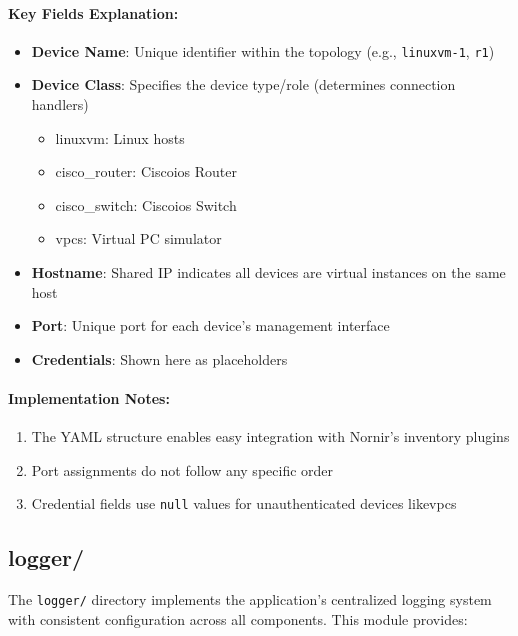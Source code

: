         \paragraph{Key Fields Explanation:}
        \begin{itemize}
            \item \textbf{Device Name}: Unique identifier within the topology (e.g., \texttt{linuxvm-1}, \texttt{r1})
            \item \textbf{Device Class}: Specifies the device type/role (determines connection handlers)
            \begin{itemize}
                \item linuxvm: Linux hosts
                \item cisco\_router: Cisco\ac{ios} Router
                \item cisco\_switch: Cisco\ac{ios} Switch
                \item vpcs: Virtual PC simulator
            \end{itemize}
            \item \textbf{Hostname}: Shared IP indicates all devices are virtual instances on the same host
            \item \textbf{Port}: Unique port for each device's management interface
            \item \textbf{Credentials}: Shown here as placeholders 
        \end{itemize}

        \paragraph{Implementation Notes:}
        \begin{enumerate}
            \item The YAML structure enables easy integration with Nornir's inventory plugins
            \item Port assignments do not follow any specific order
            \item Credential fields use \texttt{null} values for unauthenticated devices like\ac{vpcs}
        \end{enumerate}



    \subsection{logger/}
        The \texttt{logger/} directory implements the application's centralized logging system with consistent 
        configuration across all components. This module provides:

